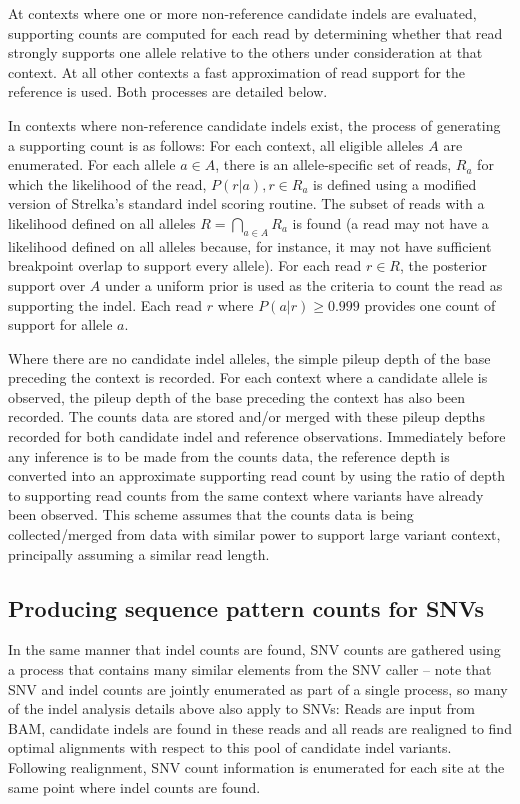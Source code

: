 \documentclass{article}
\begin{document}
At contexts where one or more non-reference candidate indels are evaluated, supporting counts are computed for each read by determining whether that read strongly supports one allele relative to the others under consideration at that context. At all other contexts a fast approximation of read support for the reference is used. Both processes are detailed below.

In contexts where non-reference candidate indels exist, the process of generating a supporting count is as follows: For each context, all eligible alleles $A$ are enumerated. For each allele $a \in A$, there is an allele-specific set of reads, $R_a$ for which the likelihood of the read, $P( r \vert a ), r \in R_a$ is defined using a modified version of Strelka's standard indel scoring routine. The subset of reads with a likelihood defined on all alleles $R = \bigcap_{a \in A} R_a$ is found (a read may not have a likelihood defined on all alleles because, for instance, it may not have sufficient breakpoint overlap to support every allele). For each read $r \in R$, the posterior support over $A$ under a uniform prior is used as the criteria to count the read as supporting the indel. Each read $r$ where $P( a \vert r ) \geq 0.999$ provides one count of support for allele $a$.

Where there are no candidate indel alleles, the simple pileup depth of the base preceding the context is recorded. For each context where a candidate allele is observed, the pileup depth of the base preceding the context has also been recorded. The counts data are stored and/or merged with these pileup depths recorded for both candidate indel and reference observations. Immediately before any inference is to be made from the counts data, the reference depth is converted into an approximate supporting read count by using the ratio of depth to supporting read counts from the same context where variants have already been observed. This scheme assumes that the counts data is being collected/merged from data with similar power to support large variant context, principally assuming a similar read length.

\subsection{Producing sequence pattern counts for SNVs}

In the same manner that indel counts are found, SNV counts are gathered using a process that contains many similar elements from the SNV caller -- note that SNV and indel counts are jointly enumerated as part of a single process, so many of the indel analysis details above also apply to SNVs: Reads are input from BAM, candidate indels are found in these reads and all reads are realigned to find optimal alignments with respect to this pool of candidate indel variants. Following realignment, SNV count information is enumerated for each site at the same point where indel counts are found.
\end{document}
